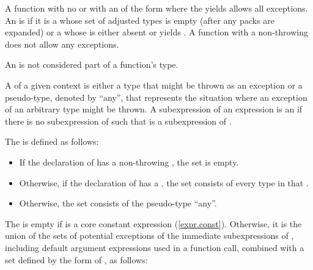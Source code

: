\pnum
A function with no
or with an  of the form
\tcode{)} where
the  yields 
allows all exceptions.
An  is  if it is
a  whose
set of adjusted types is empty (after any packs are expanded)
or a  whose
 is either absent or
yields .
A function with a non-throwing
does not allow any exceptions.

\pnum
An
is not considered part of a function's type.

\pnum
A  of a given context is either a type that might be
thrown as an exception or a pseudo-type, denoted by ``any'', that
represents the situation where an exception of an arbitrary type might
be thrown. A subexpression  of an expression  is an
 if there is no subexpression  of 
such that  is a subexpression of .

\pnum
The   is defined as follows:
\begin{itemize}
\item
If the declaration of  has a non-throwing
, the set is empty.
\item
Otherwise, if the declaration of  has a
, the set consists of
every type in that .
\item
Otherwise, the set consists of the pseudo-type ``any''.
\end{itemize}

\pnum
The   is empty
if  is a core constant expression (\ref{expr.const}).
Otherwise, it is the union of the sets of potential exceptions of
the immediate subexpressions of ,
including default argument expressions used in a function call,
combined with a set  defined by the form of , as follows:

